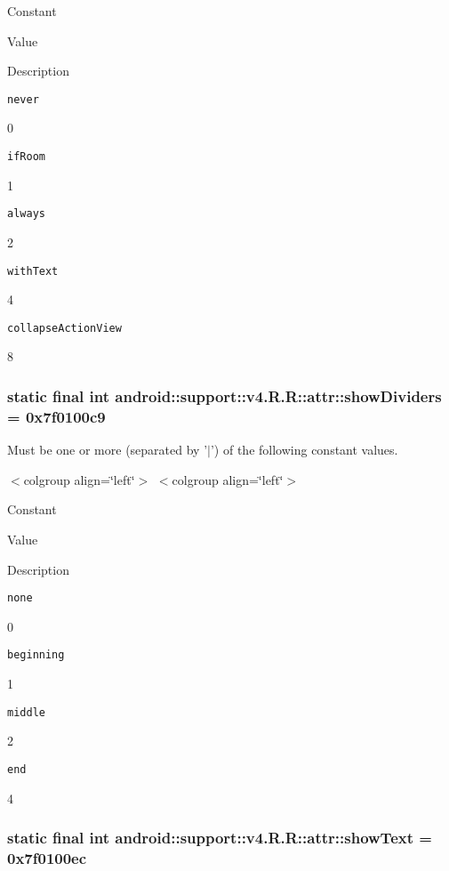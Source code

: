 Constant

Value

Description 

{\tt never}

0

{\tt ifRoom}

1

{\tt always}

2

{\tt withText}

4

{\tt collapseActionView}

8\hypertarget{classandroid_1_1support_1_1v4_1_1_r_1_1attr_d3e3dfd43274622c28a9fd14d2302e98}{
\subsubsection[{showDividers}]{\setlength{\rightskip}{0pt plus 5cm}static final int android::support::v4.R.R::attr::showDividers = 0x7f0100c9}}
\label{classandroid_1_1support_1_1v4_1_1_r_1_1attr_d3e3dfd43274622c28a9fd14d2302e98}


Must be one or more (separated by '$|$') of the following constant values. \begin{TabularC}{0}
\hline
\end{TabularC}
$<$colgroup align=\char`\"{}left\char`\"{}$>$ $<$colgroup align=\char`\"{}left\char`\"{}$>$ 

Constant

Value

Description 

{\tt none}

0

{\tt beginning}

1

{\tt middle}

2

{\tt end}

4\hypertarget{classandroid_1_1support_1_1v4_1_1_r_1_1attr_7f6630f20c86cc2dac68bb38bbc4ffa4}{
\subsubsection[{showText}]{\setlength{\rightskip}{0pt plus 5cm}static final int android::support::v4.R.R::attr::showText = 0x7f0100ec}}
\label{classandroid_1_1support_1_1v4_1_1_r_1_1attr_7f6630f20c86cc2dac68bb38bbc4ffa4}


